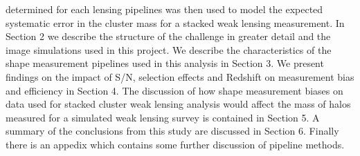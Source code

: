 \documentclass[useAMS,usenatbib]{mn2e}
\begin{document}
determined for each lensing pipelines was then used to model the 
expected systematic error in the cluster mass for a stacked weak lensing measurement.
\indent
In Section 2 we describe the structure of the challenge in greater detail and the image simulations used in this
project. We describe the characteristics of the shape
measurement pipelines used in this analysis in Section 3. We present
findings on the impact of S/N, selection effects and
Redshift on measurement bias and efficiency in Section 4. The
discussion of how shape measurement biases on data used for stacked cluster weak lensing analysis would affect
the mass of halos measured for a simulated weak lensing
survey is contained in Section 5.  A summary of the conclusions from this study are discussed in
Section 6.  Finally there is an appedix which contains some further
discussion of pipeline methods. 
\end{document}
